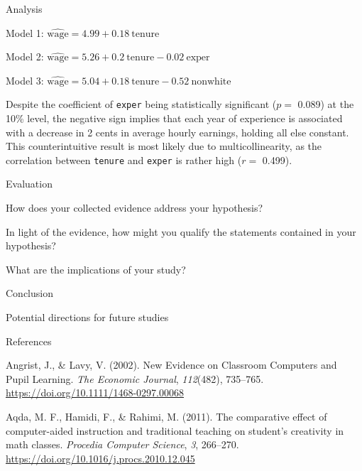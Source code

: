 \documentclass[
  ignorenonframetext,
]{beamer}
\begin{document}
\begin{frame}[fragile]{Analysis}
\protect\hypertarget{analysis}{}

Model 1: \(\widehat{\text{wage}} = 4.99 + 0.18~\text{tenure}\)

Model 2:
\(\widehat{\text{wage}} = 5.26 + 0.2~\text{tenure} -0.02 ~\text{exper}\)

Model 3:
\(\widehat{\text{wage}} = 5.04 + 0.18~\text{tenure} -0.52 ~\text{nonwhite}\)

Despite the coefficient of \texttt{exper} being statistically
significant (\(p =\) 0.089) at the 10\% level, the negative sign implies
that each year of experience is associated with a decrease in 2 cents in
average hourly earnings, holding all else constant. This
counterintuitive result is most likely due to multicollinearity, as the
correlation between \texttt{tenure} and \texttt{exper} is rather high
(\(r =\) 0.499).

\end{frame}

\begin{frame}{Evaluation}
\protect\hypertarget{evaluation}{}

How does your collected evidence address your hypothesis?

In light of the evidence, how might you qualify the statements contained
in your hypothesis?

What are the implications of your study?

\end{frame}

\begin{frame}{Conclusion}
\protect\hypertarget{conclusion}{}

Potential directions for future studies

\end{frame}

\begin{frame}{References}
\protect\hypertarget{references}{}

\hypertarget{refs}{}
\leavevmode\hypertarget{ref-Angrist02}{}%
Angrist, J., \& Lavy, V. (2002). New Evidence on Classroom Computers and
Pupil Learning. \emph{The Economic Journal}, \emph{112}(482), 735--765.
\url{https://doi.org/10.1111/1468-0297.00068}

\leavevmode\hypertarget{ref-Aqda11}{}%
Aqda, M. F., Hamidi, F., \& Rahimi, M. (2011). The comparative effect of
computer-aided instruction and traditional teaching on student's
creativity in math classes. \emph{Procedia Computer Science}, \emph{3},
266--270. \url{https://doi.org/10.1016/j.procs.2010.12.045}

\end{frame}

\printbibliography
\end{document}
